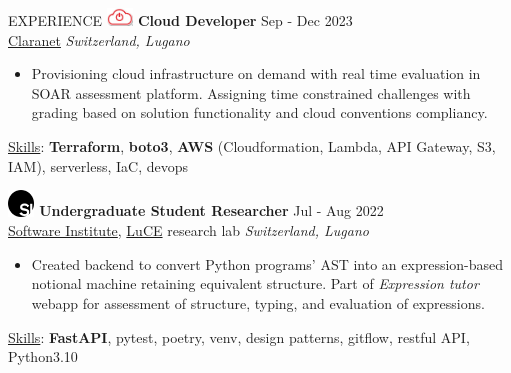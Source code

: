 \documentclass{cv} %
\def\intraexpvspace{0.15cm}
\def\titlelistvspace{-0.15cm}
\begin{document}
\begin{rSection}{EXPERIENCE}
    \includegraphics[width=0.7cm, trim={0cm 15cm 0cm 0cm}]{claranet-logo.png}
    \textbf{Cloud Developer} \hfill Sep - Dec 2023\\
    \hspace*{0.85cm}\href{https://www.claranet.com/}{Claranet}
    \hfill \textit{Switzerland, Lugano}
    \vspace{\titlelistvspace}\begin{itemize}
        \itemsep -3pt {}
        \item Provisioning cloud infrastructure on demand
              with real time evaluation in SOAR assessment platform.
              Assigning time constrained challenges with grading based on solution functionality
              and cloud conventions compliancy.
    \end{itemize}
    \vspace*{-0.1cm}\hspace*{0.5cm}\underline{Skills}: \textbf{Terraform},
    \textbf{boto3},
    \textbf{AWS} (Cloudformation, Lambda, API Gateway, S3, IAM), %
    serverless,
    IaC,
    devops
    \vspace{\intraexpvspace}

    \includegraphics[width=0.7cm, trim={0cm 10cm 0cm 0cm}]{si-icon.jpg}
    \hspace*{0cm}\textbf{Undergraduate Student Researcher} \hfill Jul - Aug 2022\\
    \hspace*{0.85cm}\href{https://www.si.usi.ch/}{Software Institute},
    \href{https://luce.si.usi.ch/}{LuCE} research lab
    \hfill \textit{Switzerland, Lugano}
    \vspace{\titlelistvspace}\begin{itemize}
        \itemsep -3pt {}
        \item Created backend to convert Python programs' AST
              into an expression-based notional machine retaining equivalent structure.
              Part of \textit{Expression tutor} webapp for assessment of structure, typing, and evaluation of expressions.
    \end{itemize}
    \vspace*{-0.1cm}\hspace*{0.5cm}\underline{Skills}: \textbf{FastAPI}, pytest, poetry, venv, design patterns, gitflow, restful API, Python3.10
    \vspace{\intraexpvspace}


\end{rSection}
\end{document}
